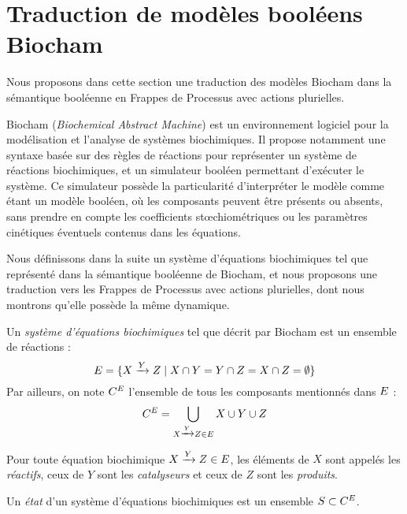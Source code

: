 
\section{Traduction de modèles booléens Biocham}

Nous proposons dans cette section une traduction des modèles Biocham dans la sémantique booléenne
en Frappes de Processus avec actions plurielles.

\myskip

Biocham (\textit{Biochemical Abstract Machine})
est un environnement logiciel pour la modélisation et l'analyse de systèmes biochimiques.
Il propose notamment une syntaxe basée sur des règles de réactions pour représenter
un système de réactions biochimiques,
et un simulateur booléen permettant d'exécuter le système.
Ce simulateur possède la particularité d'interpréter le modèle comme étant un modèle booléen,
où les composants peuvent être présents ou absents,
sans prendre en compte les coefficients stœchiométriques ou les paramètres cinétiques
éventuels contenus dans les équations.

Nous définissons dans la suite un système d'équations biochimiques
tel que représenté dans la sémantique booléenne de Biocham,
et nous proposons une traduction vers les Frappes de Processus avec actions plurielles,
dont nous montrons qu'elle possède la même dynamique.


\begin{definition}
  Un \emph{système d'équations biochimiques} tel que décrit par Biocham
  est un ensemble de réactions :
  \[\BCe = \{ X \xrightarrow{Y} Z \mid X \cap Y = Y \cap Z = X \cap Z = \emptyset \}\]
  Par ailleurs, on note $\BCc[\BCe]$
  l'ensemble de tous les composants mentionnés dans $\BCe$ :
  \[\BCc = \bigcup_{X \xrightarrow{Y} Z \in \BCe} X \cup Y \cup Z\]
  
  Pour toute équation biochimique $X \xrightarrow{Y} Z \in \BCe$,
  les éléments de $X$ sont appelés les \emph{réactifs}, ceux de $Y$ sont les \emph{catalyseurs}
  et ceux de $Z$ sont les \emph{produits}.
  
  Un \emph{état} d'un système d'équations biochimiques est un ensemble $S \subset \BCc$.
\end{definition}

